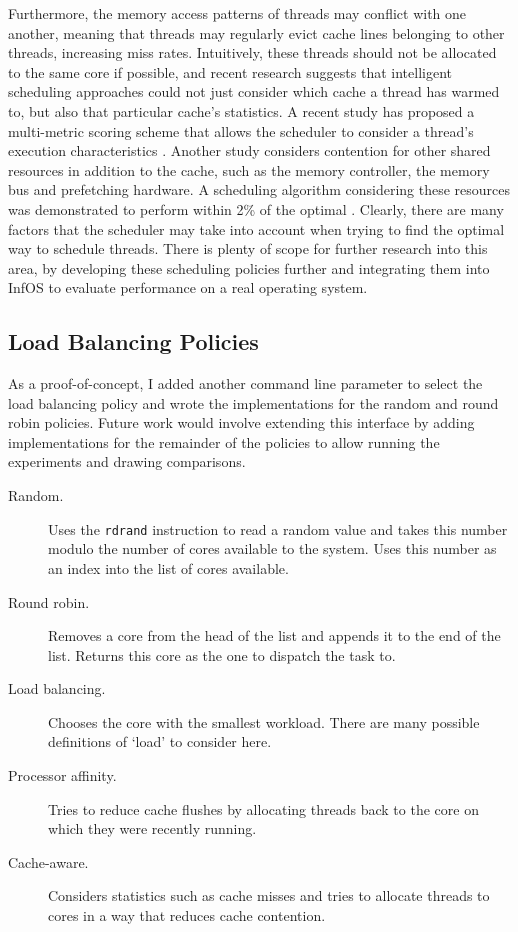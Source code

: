 \documentclass[bsc,frontabs,singlespacing,parskip,deptreport]{infthesis}
\begin{document}
Furthermore, the memory access patterns of threads may conflict with one another, meaning that threads may regularly evict cache lines belonging to other threads, increasing miss rates. Intuitively, these threads should not be allocated to the same core if possible, and recent research suggests that intelligent scheduling approaches could not just consider which cache a thread has warmed to, but also that particular cache's statistics. A recent study has proposed a multi-metric scoring scheme that allows the scheduler to consider a thread's execution characteristics \cite{adaptive-sched}. Another study considers contention for other shared resources in addition to the cache, such as the memory controller, the memory bus and prefetching hardware. A scheduling algorithm considering these resources was demonstrated to perform within 2\% of the optimal \cite{contention-aware-sched}. Clearly, there are many factors that the scheduler may take into account when trying to find the optimal way to schedule threads. There is plenty of scope for further research into this area, by developing these scheduling policies further and integrating them into InfOS to evaluate performance on a real operating system.




\subsection{Load Balancing Policies} \label{load-balancing-policies}
As a proof-of-concept, I added another command line parameter to select the load balancing policy and wrote the implementations for the random and round robin policies. Future work would involve extending this interface by adding implementations for the remainder of the policies to allow running the experiments and drawing comparisons.

\begin{description}
\item[Random.] Uses the \verb|rdrand| instruction to read a random value and takes this number modulo the number of cores available to the system. Uses this number as an index into the list of cores available.
\item[Round robin.] Removes a core from the head of the list and appends it to the end of the list. Returns this core as the one to dispatch the task to.
\item[Load balancing.] Chooses the core with the smallest workload. There are many possible definitions of `load' to consider here.
\item[Processor affinity.] Tries to reduce cache flushes by allocating threads back to the core on which they were recently running.
\item[Cache-aware.] Considers statistics such as cache misses and tries to allocate threads to cores in a way that reduces cache contention.
\end{description}
\end{document}
